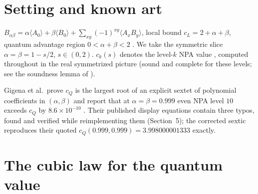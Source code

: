 \documentclass[11pt]{article}
\begin{document}
\begin{abstract}
mechanism: rescaling to the critical corner, the degeneracy has a universal
form and the limiting obstruction is (a rescaling of) the \emph{Motzkin
polynomial}, the classical nonnegative-but-not-sum-of-squares form, so the
finite-level failure sits in the restricted-certificate regime rather than in
sum-of-squares degree. The phase boundary has a precise geometric reading: by
Nie's finite-convergence theorem (through Marshall's boundary Hessian
condition), a self-tested optimum is finitely NPA-certifiable whenever its
boundary Hessian is nondegenerate --- contact order exactly two --- so the
single-tilt functional (a quadratic touch) is finitely exact at level $1{+}AB$,
while the doubly-tilted cubic touch is exactly where this condition fails. Three
verified errata in the published polynomial system of Gigena et al.\ are
documented.
\end{abstract}

\section{Setting and known art}

$B_{\alpha\beta}=\alpha\langle A_0\rangle+\beta\langle
B_0\rangle+\sum_{xy}(-1)^{xy}\langle A_xB_y\rangle$, local bound
$c_L=2+\alpha+\beta$, quantum advantage region $0<\alpha+\beta<2$
\cite{Gigena}. We take the symmetric slice $\alpha=\beta=1-s/2$,
$s\in(0,2)$. $c_k(s)$ denotes the level-$k$ NPA value \cite{NPA}, computed
throughout in the real symmetrized picture (sound and complete for these
levels; see the soundness lemma of \cite{sep}).

Gigena et al.\ prove $c_Q$ is the largest root of an explicit sextet of
polynomial coefficients in $(\alpha,\beta)$ and report that at
$\alpha=\beta=0.999$ even NPA level $10$ exceeds $c_Q$ by
$8.6\times10^{-10}$ \cite{Gigena}. Their published display equations contain
three typos, found and verified while reimplementing them (Section~5); the
corrected sextic reproduces their quoted $c_Q(0.999,0.999)=3.998000001333$
exactly.

\section{The cubic law for the quantum value}
\end{document}

